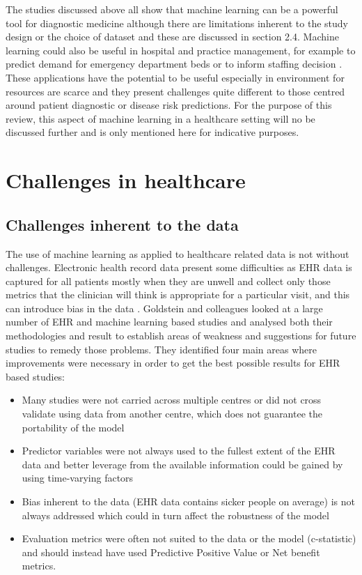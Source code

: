  The studies discussed above all show that machine learning can be a powerful tool for diagnostic medicine although there are limitations inherent to the study design or the choice of dataset and these are discussed in section 2.4.\newline
Machine learning could also be useful in hospital and practice management, for example to predict demand for emergency department beds or to inform staffing decision \citep{Callahan:2017bz, Tiwari:2014bq}. These applications have the potential to be useful especially in environment for resources are scarce and they present challenges quite different to those centred around patient diagnostic or disease risk predictions. For the purpose of this review, this aspect of machine learning in a healthcare setting will no be discussed further and is only mentioned here for indicative purposes.


\section{Challenges in healthcare}
\subsection{Challenges inherent to the data}
The use of machine learning as applied to healthcare related data is not without challenges. 
Electronic health record data present some difficulties as EHR data is captured for all patients mostly when they are unwell and collect only those metrics that the clinician will think is appropriate for a particular visit, and this can introduce bias in the data \citep{Hersh:2013gp, Goldstein:2017bk}. \newline 
Goldstein and colleagues looked at a large number of EHR and machine learning based studies and analysed both their methodologies and result to  establish areas of weakness and suggestions for future studies to remedy those problems. They identified four main areas where improvements were necessary in order to get the best possible results for EHR based studies: 
\begin{itemize}
    \item Many studies were not carried across multiple centres or did not cross validate using data from another centre, which does not guarantee the portability of the model 
    \item Predictor variables were not always used to the fullest extent of the EHR data and better leverage from the available information could be gained by using time-varying factors
    \item Bias inherent to the data (EHR data contains sicker people on average) is not always addressed which could in turn affect the robustness of the model
    \item Evaluation metrics were often not suited to the data or the model (c-statistic) and should instead have used Predictive Positive Value or Net benefit metrics. 
\end{itemize}

